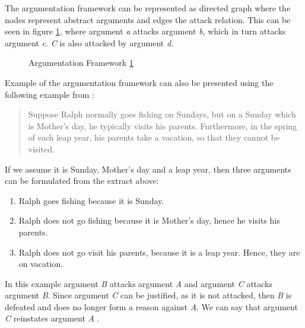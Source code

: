 The argumentation framework can be represented as directed graph where the nodes represent abstract arguments and edges the attack relation. This can be seen in figure \ref{fig:argumentationFrameworkFigure}, where argument \textit{a} attacks argument \textit{b}, which in turn attacks argument \textit{c}. \textit{C} is also attacked by argument \textit{d}.
\newpage
\begin{figure}[h]
\centering
{}
\caption{Argumentation Framework \ref{fig:argumentationFrameworkFigure}}
\label{fig:argumentationFrameworkFigure}
\end{figure}
 
Example of the argumentation framework can also be presented using the following example from \citet{konolige1988defeasible}:
\begin{quote}
Suppose Ralph normally goes fishing on Sundays, but on a Sunday which is
Mother’s day, he typically visits his parents. Furthermore, in the spring of each
leap year, his parents take a vacation, so that they cannot be visited.
\end{quote}
If we assume it is Sunday, Mother's day and a leap year, then three arguments can be formulated from the extract above:
\begin{enumerate}[label=\Alph*]
	\item{Ralph goes fishing because it is Sunday.}
	\item{Ralph does not go fishing because it is Mother's day, hence he visits his parents.}
	\item{Ralph does not go visit his parents, because it is a leap year. Hence, they are on vacation.}
\end{enumerate}
In this example argument \textit{B} attacks argument \textit{A} and argument \textit{C} attacks argument \textit{B}. Since argument \textit{C} can be justified, as it is not attacked, then \textit{B} is defeated and does no longer form a reason against \textit{A}. We can say that argument \textit{C} reinstates argument \textit{A} \citep{caminada2004sake}.


